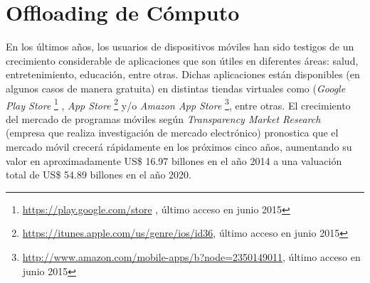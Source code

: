 
\chapter{Offloading de Cómputo} %

\label{ch:Chapter3} %


En los últimos años, los usuarios de dispositivos móviles han sido testigos de un crecimiento considerable de aplicaciones
que son útiles en diferentes áreas: salud, entretenimiento, educación, entre otras. Dichas aplicaciones están disponibles 
(en algunos casos de manera gratuita) en distintas tiendas virtuales como (\emph{Google Play Store} \footnote{\url{https://play.google.com/store}
, último acceso en junio 2015}
, \emph{App Store} \footnote{\url{https://itunes.apple.com/us/genre/ios/id36}, último acceso en junio 2015}
y/o \emph{Amazon App Store} \footnote{\url{http://www.amazon.com/mobile-apps/b?node=2350149011}, último acceso en junio 2015}, entre otras. El crecimiento del mercado de programas móviles según
\emph{Transparency Market Research} ~\cite{transparencymarketresearch2014} (empresa que realiza investigación de mercado electrónico) 
pronostica que el mercado móvil crecerá rápidamente en los próximos cinco años, aumentando su valor en aproximadamente US\$ 16.97 billones
en el año 2014 a una valuación total de US\$ 54.89  billones en el año 2020. 

